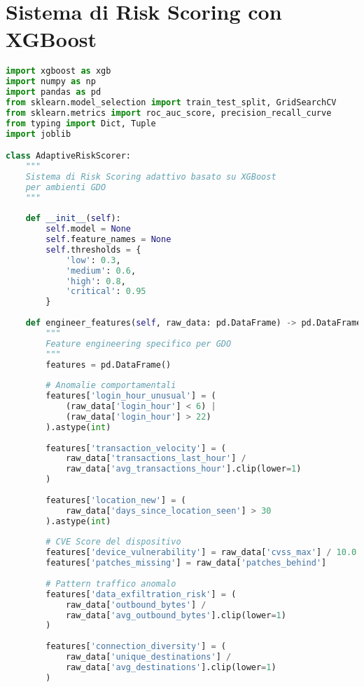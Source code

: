 \section{\texorpdfstring{Sistema di Risk Scoring con XGBoost}{C.3 - Sistema di Risk Scoring con XGBoost}}

\begin{lstlisting}[language=Python, caption=Implementazione Risk Scoring adattivo con XGBoost]
import xgboost as xgb
import numpy as np
import pandas as pd
from sklearn.model_selection import train_test_split, GridSearchCV
from sklearn.metrics import roc_auc_score, precision_recall_curve
from typing import Dict, Tuple
import joblib

class AdaptiveRiskScorer:
    """
    Sistema di Risk Scoring adattivo basato su XGBoost
    per ambienti GDO
    """
    
    def __init__(self):
        self.model = None
        self.feature_names = None
        self.thresholds = {
            'low': 0.3,
            'medium': 0.6,
            'high': 0.8,
            'critical': 0.95
        }
        
    def engineer_features(self, raw_data: pd.DataFrame) -> pd.DataFrame:
        """
        Feature engineering specifico per GDO
        """
        features = pd.DataFrame()
        
        # Anomalie comportamentali
        features['login_hour_unusual'] = (
            (raw_data['login_hour'] < 6) | 
            (raw_data['login_hour'] > 22)
        ).astype(int)
        
        features['transaction_velocity'] = (
            raw_data['transactions_last_hour'] / 
            raw_data['avg_transactions_hour'].clip(lower=1)
        )
        
        features['location_new'] = (
            raw_data['days_since_location_seen'] > 30
        ).astype(int)
        
        # CVE Score del dispositivo
        features['device_vulnerability'] = raw_data['cvss_max'] / 10.0
        features['patches_missing'] = raw_data['patches_behind']
        
        # Pattern traffico anomalo
        features['data_exfiltration_risk'] = (
            raw_data['outbound_bytes'] / 
            raw_data['avg_outbound_bytes'].clip(lower=1)
        )
        
        features['connection_diversity'] = (
            raw_data['unique_destinations'] / 
            raw_data['avg_destinations'].clip(lower=1)
        )
        

\end{lstlisting}
